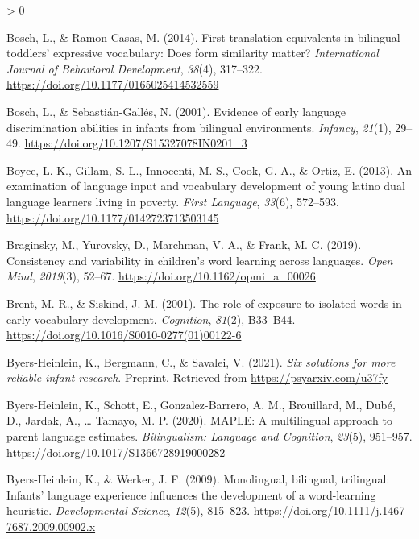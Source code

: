\documentclass[
  english,
  ,man,floatsintext]{apa6}
\newlength{\cslhangindent}
\newenvironment{CSLReferences}[2] %
 {%
  \setlength{\parindent}{0pt}
  \ifodd #1 \everypar{\setlength{\hangindent}{\cslhangindent}}\ignorespaces\fi
  \ifnum #2 > 0
  \setlength{\parskip}{#2\baselineskip}
  \fi
 }%
 {}
\begin{document}
\begin{CSLReferences}{1}{0}
\leavevmode\hypertarget{ref-Bosch_Ramon-Casas_2014}{}%
Bosch, L., \& Ramon-Casas, M. (2014). First translation equivalents in bilingual toddlers' expressive vocabulary: Does form similarity matter? \emph{International Journal of Behavioral Development}, \emph{38}(4), 317--322. \url{https://doi.org/10.1177/0165025414532559}

\leavevmode\hypertarget{ref-Bosch_Sebastian-Galles_2001}{}%
Bosch, L., \& Sebastián-Gallés, N. (2001). Evidence of early language discrimination abilities in infants from bilingual environments. \emph{Infancy}, \emph{21}(1), 29--49. \url{https://doi.org/10.1207/S15327078IN0201_3}

\leavevmode\hypertarget{ref-Boyce_etal_2013}{}%
Boyce, L. K., Gillam, S. L., Innocenti, M. S., Cook, G. A., \& Ortiz, E. (2013). An examination of language input and vocabulary development of young latino dual language learners living in poverty. \emph{First Language}, \emph{33}(6), 572--593. \url{https://doi.org/10.1177/0142723713503145}

\leavevmode\hypertarget{ref-Braginsky_etal_2019}{}%
Braginsky, M., Yurovsky, D., Marchman, V. A., \& Frank, M. C. (2019). Consistency and variability in children's word learning across languages. \emph{Open Mind}, \emph{2019}(3), 52--67. \url{https://doi.org/10.1162/opmi_a_00026}

\leavevmode\hypertarget{ref-Brent_Siskind_2001}{}%
Brent, M. R., \& Siskind, J. M. (2001). The role of exposure to isolated words in early vocabulary development. \emph{Cognition}, \emph{81}(2), B33--B44. \url{https://doi.org/10.1016/S0010-0277(01)00122-6}

\leavevmode\hypertarget{ref-Byers-Heinlein_etal_2021}{}%
Byers-Heinlein, K., Bergmann, C., \& Savalei, V. (2021). \emph{Six solutions for more reliable infant research}. Preprint. Retrieved from \url{https://psyarxiv.com/u37fy}

\leavevmode\hypertarget{ref-Byers-Heinlein_etal_2020}{}%
Byers-Heinlein, K., Schott, E., Gonzalez-Barrero, A. M., Brouillard, M., Dubé, D., Jardak, A., \ldots{} Tamayo, M. P. (2020). MAPLE: A multilingual approach to parent language estimates. \emph{Bilingualism: Language and Cognition}, \emph{23}(5), 951--957. \url{https://doi.org/10.1017/S1366728919000282}

\leavevmode\hypertarget{ref-Byers-Heinlein_Werker_2009}{}%
Byers-Heinlein, K., \& Werker, J. F. (2009). Monolingual, bilingual, trilingual: Infants' language experience influences the development of a word-learning heuristic. \emph{Developmental Science}, \emph{12}(5), 815--823. \url{https://doi.org/10.1111/j.1467-7687.2009.00902.x}


\end{CSLReferences}
\end{document}
